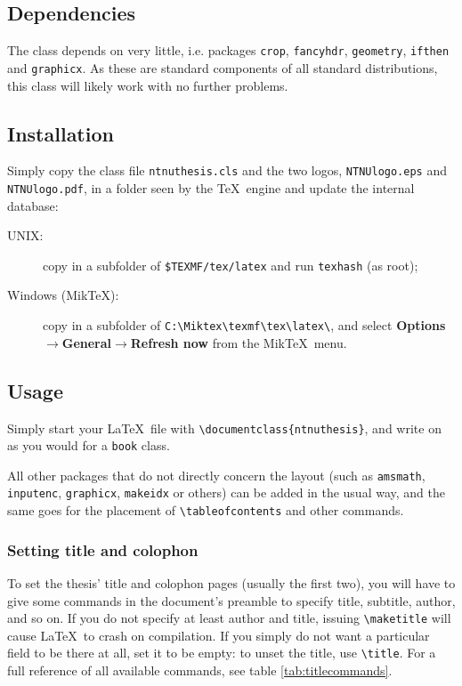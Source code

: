 \documentclass[a4paper,10pt]{article}
\begin{document}
\subsection*{Dependencies}
The class depends on very little, i.e. packages \texttt{crop}, \texttt{fancyhdr}, \texttt{geometry}, \texttt{ifthen} and \texttt{graphicx}. As these are standard components of all standard distributions, this class will likely work with no further problems.

\subsection*{Installation}
Simply copy the class file \texttt{ntnuthesis.cls} and the two logos, \texttt{NTNUlogo.eps} and \texttt{NTNUlogo.pdf}, in a folder seen by the \TeX\ engine and update the internal database:
\begin{description}
\item[UNIX:] copy in a subfolder of \verb|$TEXMF/tex/latex| and run \verb|texhash| (as root);
\item[Windows (Mik\TeX):] copy in a subfolder of \verb|C:\Miktex\texmf\tex\latex\|,  and select \textbf{Options$\rightarrow$General$\rightarrow$Refresh now} from the Mik\TeX\ menu.
\end{description}

\subsection*{Usage}
Simply start your \LaTeX\ file with \verb|\documentclass{ntnuthesis}|, and write on as you would for a \texttt{book} class.

All other packages that do not directly concern the layout (such as \texttt{amsmath}, \texttt{inputenc}, \texttt{graphicx}, \texttt{makeidx} or others) can be added in the usual way, and the same goes for the placement of \verb|\tableofcontents| and other commands.

\subsubsection*{Setting title and colophon}
To set the thesis' title and colophon pages (usually the first two), you will have to give some commands in the document's preamble to specify title, subtitle, author, and so on. If you do not specify at least author and title, issuing \texttt{\textbackslash maketitle} will cause \LaTeX\ to crash on compilation.  If you simply do not want a particular field to be there at all, set it to be empty:  to unset the title, use \texttt{\textbackslash title\textbraceleft\textbraceright}. For a full reference of all available commands, see table \ref{tab:titlecommands}.
\end{document}
